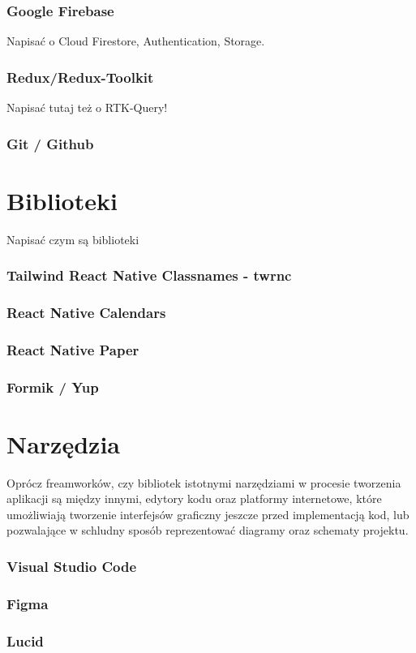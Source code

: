 \subsubsection*{\textbf{Google Firebase}}
\phantom{th}
Napisać o  Cloud Firestore,  Authentication, Storage.

\subsubsection*{\textbf{Redux/Redux-Toolkit}}
\phantom{th}
Napisać tutaj też o RTK-Query!

\subsubsection*{\textbf{Git / Github}}
\phantom{Th}

\section{Biblioteki}
Napisać czym są biblioteki
\subsubsection*{\textbf{Tailwind React Native Classnames - twrnc}}
\phantom{th}

\subsubsection*{\textbf{React Native Calendars}}
\phantom{th}

\subsubsection*{\textbf{React Native Paper}}
\phantom{th}

\subsubsection*{\textbf{Formik / Yup}}
\phantom{th}

\section{Narzędzia}
\phantom{Th}
Oprócz freamworków, czy bibliotek istotnymi narzędziami w procesie tworzenia aplikacji są między innymi, edytory kodu oraz platformy internetowe, które umożliwiają tworzenie interfejsów graficzny jeszcze przed implementacją kod, lub pozwalające w schludny sposób reprezentować diagramy oraz schematy projektu.
\subsubsection*{\textbf{Visual Studio Code}}
\phantom{Th}

\subsubsection*{\textbf{Figma}}
\phantom{Th}

\subsubsection*{\textbf{Lucid}}
\phantom{Th}